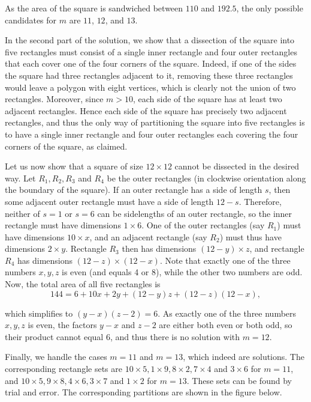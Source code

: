 \documentclass[11pt]{article}
\begin{document}
\begin{enumerate}
As the area of the square is sandwiched between $110$ and $192.5$, the only possible candidates for $m$ are $11$, $12$, and $13$.

In the second part of the solution, we show that a dissection of the square into five rectangles must consist of a single inner rectangle and four outer rectangles that each cover one of the four corners of the square. Indeed, if one of the sides the square had three rectangles adjacent to it, removing these three rectangles would leave a polygon with eight vertices, which is clearly not the union of two rectangles. Moreover, since $m > 10$, each side of the square has at least two adjacent rectangles. Hence each side of the square has precisely two adjacent rectangles, and thus the only way of partitioning the square into five rectangles is to have a single inner rectangle and four outer rectangles each covering the four corners of the square, as claimed.

Let us now show that a square of size $12 \times 12$ cannot be dissected in the desired way. Let $R_1, R_2, R_3$ and $R_4$ be the outer rectangles (in clockwise orientation along the boundary of the square). If an outer rectangle has a side of length $s$, then some adjacent outer rectangle must have a side of length $12 − s$. Therefore, neither of $s = 1$ or $s = 6$ can be sidelengths of an outer rectangle, so the inner rectangle must have dimensions $1 \times 6$. One of the outer rectangles (say $R_1$) must have dimensions $10 \times x$, and an adjacent rectangle (say $R_2$) must thus have dimensions $2 \times y$. Rectangle $R_3$ then has dimensions $(12 − y) \times z$, and rectangle $R_4$ has dimensions $(12 - z) \times (12 - x)$. Note that exactly one of the three numbers $x, y, z$ is even (and equals 4 or 8), while the other two numbers are odd. Now, the total area of all five rectangles is
$$ 144 = 6 + 10x + 2y + (12 - y) z + (12 - z)(12 - x), $$

which simplifies to $(y - x)(z - 2) = 6$. As exactly one of the three numbers $x, y, z$ is even, the factors $y - x$ and $z - 2$ are either both even or both odd, so their product cannot equal 6, and thus there is no solution with $m = 12$.

Finally, we handle the cases $m = 11$ and $m = 13$, which indeed are solutions. The corresponding rectangle sets are $10 \times 5, 1 \times 9, 8 \times 2, 7 \times 4$ and $3 \times 6$ for $m = 11$, and $10 \times 5, 9 \times 8, 4 \times 6, 3 \times 7$ and $1 \times 2$ for $m = 13$. These sets can be found by trial and error. The corresponding partitions are shown in the figure below.


\end{enumerate}
\end{document}
